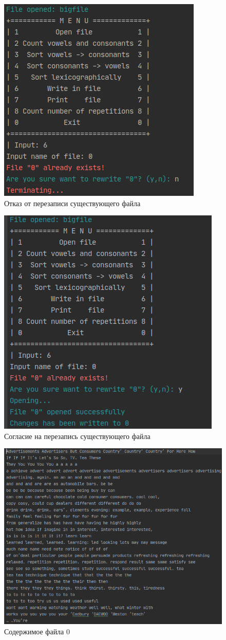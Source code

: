 \documentclass[12pt,a4paper]{article}  %
\begin{document}
\begin{figure}[htp!]
	\centering
	\includegraphics[width=0.5\linewidth]{photo/tests/rewrite_no}
	\caption{Отказ от перезаписи существующего файла}
	\label{rewrite_no}
\end{figure}

\begin{figure}[htp!]
	\centering
	\includegraphics[width=0.5\linewidth]{photo/tests/rewrite_yes}
	\caption{Согласие на перезапись существующего файла}
	\label{rewrite_yes}
\end{figure}

\begin{figure}[htp!]
	\centering
	\includegraphics[width=0.9\linewidth]{photo/tests/lex_txt}
	\caption{Содержимое файла 0}
	\label{lex_fake_txt}
\end{figure}
\end{document}
